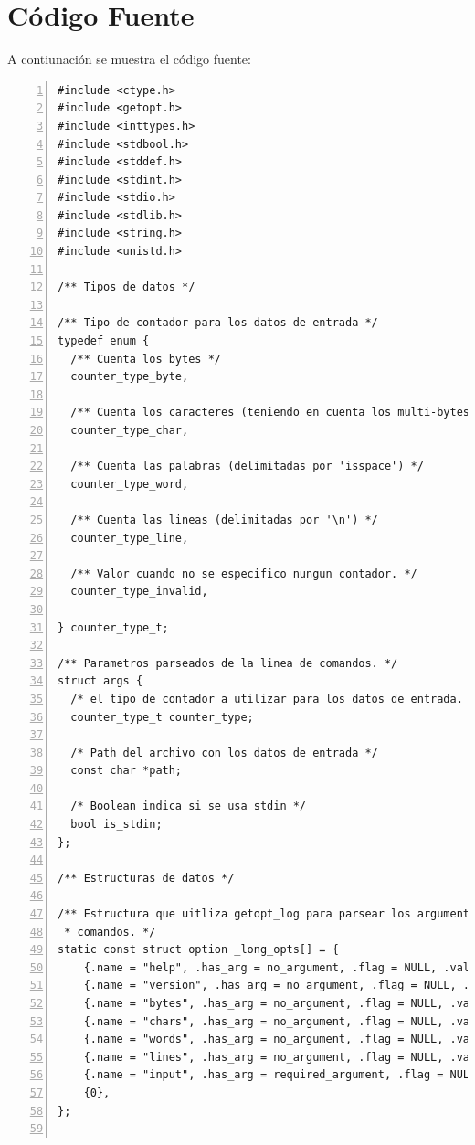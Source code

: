 \section{C\'odigo Fuente}


A contiunaci\'on se muestra el c\'odigo fuente:

\begin{tiny}
\begin{lstlisting}[numbers=left, tabsize=2, basicstyle=\fontsize{11}{13}\ttfamily, frame=single, caption={c\'odigo fuente del programa}]
#include <ctype.h>
#include <getopt.h>
#include <inttypes.h>
#include <stdbool.h>
#include <stddef.h>
#include <stdint.h>
#include <stdio.h>
#include <stdlib.h>
#include <string.h>
#include <unistd.h>

/** Tipos de datos */

/** Tipo de contador para los datos de entrada */
typedef enum {
  /** Cuenta los bytes */
  counter_type_byte,

  /** Cuenta los caracteres (teniendo en cuenta los multi-bytes) */
  counter_type_char,

  /** Cuenta las palabras (delimitadas por 'isspace') */
  counter_type_word,

  /** Cuenta las lineas (delimitadas por '\n') */
  counter_type_line,

  /** Valor cuando no se especifico nungun contador. */
  counter_type_invalid,

} counter_type_t;

/** Parametros parseados de la linea de comandos. */
struct args {
  /* el tipo de contador a utilizar para los datos de entrada. */
  counter_type_t counter_type;

  /* Path del archivo con los datos de entrada */
  const char *path;

  /* Boolean indica si se usa stdin */
  bool is_stdin;
};

/** Estructuras de datos */

/** Estructura que uitliza getopt_log para parsear los argumentos de linea de
 * comandos. */
static const struct option _long_opts[] = {
    {.name = "help", .has_arg = no_argument, .flag = NULL, .val = 'h'},
    {.name = "version", .has_arg = no_argument, .flag = NULL, .val = 'V'},
    {.name = "bytes", .has_arg = no_argument, .flag = NULL, .val = 'b'},
    {.name = "chars", .has_arg = no_argument, .flag = NULL, .val = 'c'},
    {.name = "words", .has_arg = no_argument, .flag = NULL, .val = 'w'},
    {.name = "lines", .has_arg = no_argument, .flag = NULL, .val = 'l'},
    {.name = "input", .has_arg = required_argument, .flag = NULL, .val = 'i'},
    {0},
};


\end{lstlisting}
\end{tiny}
